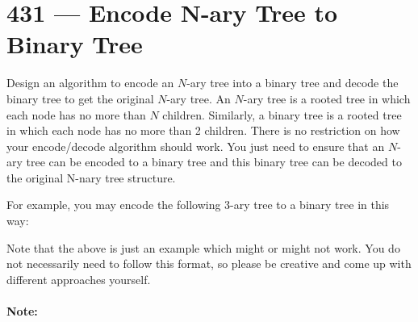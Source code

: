 \section{431 --- Encode N-ary Tree to Binary Tree}
Design an algorithm to encode an $N$-ary tree into a binary tree and decode the binary tree to get the original $N$-ary tree. An $N$-ary tree is a rooted tree in which each node has no more than $ N $ children. Similarly, a binary tree is a rooted tree in which each node has no more than 2 children. There is no restriction on how your encode/decode algorithm should work. You just need to ensure that an $ N $-ary tree can be encoded to a binary tree and this binary tree can be decoded to the original N-nary tree structure.

For example, you may encode the following 3-ary tree to a binary tree in this way:

\begin{figure}[H]
\end{figure}


Note that the above is just an example which might or might not work. You do not necessarily need to follow this format, so please be creative and come up with different approaches yourself.

\paragraph{Note:}

